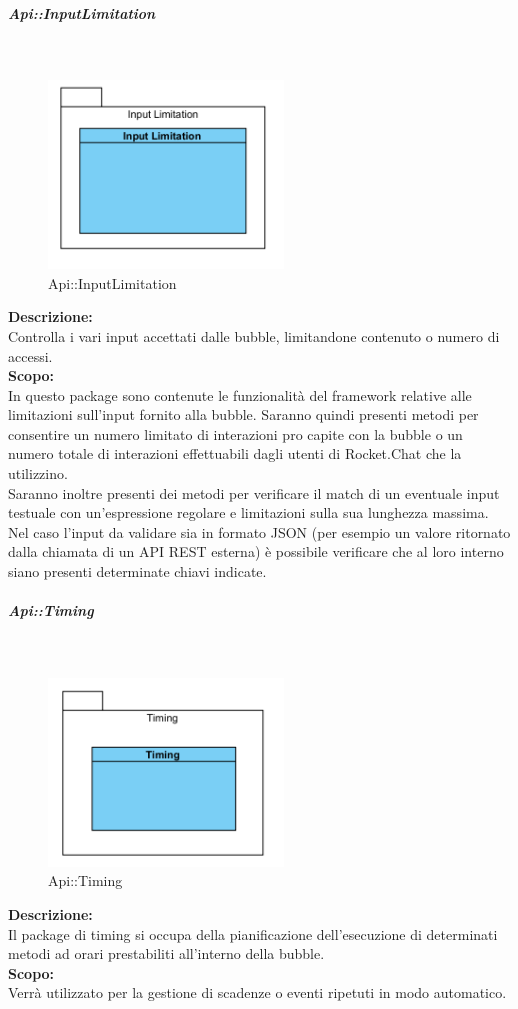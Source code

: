\begin{samepage}
\subparagraph{Api\-::Input\-Limitation}\label{api-limiti}\mbox{}\\
\nopagebreak
\begin{figure}[H]
	\centering
	\includegraphics[height=5cm]{diagrammi_img/classi_e_package/api_limitinput.png}
	\caption{Api\-::Input\-Limitation}
\end{figure}
\end{samepage}
\textbf{Descrizione:}\\
Controlla i vari input accettati dalle bubble, limitandone contenuto o numero di accessi.\\
\textbf{Scopo:}\\
In questo package sono contenute le funzionalità del framework relative alle limitazioni sull'input fornito alla bubble. Saranno quindi presenti metodi per consentire un numero limitato di interazioni pro capite con la bubble o un numero totale di interazioni effettuabili dagli utenti di Rocket.Chat che la utilizzino.\\
Saranno inoltre presenti dei metodi per verificare il match di un eventuale input testuale con un'espressione regolare e limitazioni sulla sua lunghezza massima. Nel caso l'input da validare sia in formato JSON (per esempio un valore ritornato dalla chiamata di un API REST esterna) è possibile verificare che al loro interno siano presenti determinate chiavi indicate.

\begin{samepage}
\subparagraph{Api\-::Timing}\label{api-timing}\mbox{}\\
\nopagebreak
\begin{figure}[H]
	\centering
	\includegraphics[height=5cm]{diagrammi_img/classi_e_package/api_timing.png}
	\caption{Api\-::Timing}
\end{figure}
\end{samepage}
\textbf{Descrizione:}\\
Il package di timing si occupa della pianificazione dell'esecuzione di determinati metodi ad orari prestabiliti all'interno della bubble.\\
\textbf{Scopo:}\\
Verrà utilizzato per la gestione di scadenze o eventi ripetuti in modo automatico.

